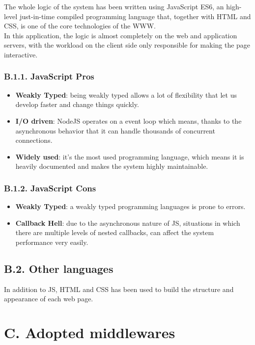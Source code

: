 The whole logic of the system has been written using JavaScript ES6, an high-level just-in-time compiled programming language that, together with HTML and CSS, is one of the core technologies of the WWW.\\
In this application, the logic is almost completely on the web and application servers, with the workload on the client side only responsible for making the page interactive.

\subsubsection{B.1.1. JavaScript Pros}

\begin{itemize}
  \item \textbf{Weakly Typed}: being weakly typed allows a lot of flexibility that let us develop faster and change things quickly.
  \item \textbf{I/O driven}: NodeJS operates on a event loop which means, thanks to the asynchronous behavior that it can handle thousands of concurrent connections.
  \item \textbf{Widely used}: it's the most used programming language, which means it is heavily documented and makes the system highly maintainable.
\end{itemize}

\subsubsection{B.1.2. JavaScript Cons}

\begin{itemize}
  \item \textbf{Weakly Typed}: a weakly typed programming languages is prone to errors.
  \item \textbf{Callback Hell}: due to the asynchronous nature of JS, situations in which there are multiple levels of nested callbacks, can affect the system performance very easily.
\end{itemize}

\subsection{B.2. Other languages}

In addition to JS, HTML and CSS has been used to build the structure and appearance of each web page.

\section{C. Adopted middlewares}

